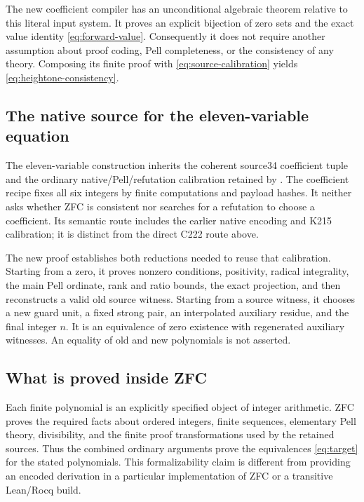 The new coefficient compiler has an unconditional algebraic theorem
relative to this literal input system. It proves an explicit bijection
of zero sets and the exact value identity \eqref{eq:forward-value}.
Consequently it does not require another assumption about proof coding,
Pell completeness, or the consistency of any theory. Composing its
finite proof with \eqref{eq:source-calibration} yields
\eqref{eq:heightone-consistency}.

\subsection{The native source for the eleven-variable equation}

The eleven-variable construction inherits the coherent source34
coefficient tuple and the ordinary native/Pell/refutation calibration
retained by \cite{coprime}. The coefficient recipe fixes all six
integers by finite computations and payload hashes. It neither asks
whether ZFC is consistent nor searches for a refutation to choose a
coefficient. Its semantic route includes the earlier native encoding
and K215 calibration; it is distinct from the direct C222 route above.

The new proof establishes both reductions needed to reuse that
calibration. Starting from a zero, it proves nonzero conditions,
positivity, radical integrality, the main Pell ordinate, rank and ratio
bounds, the exact projection, and then reconstructs a valid old source
witness. Starting from a source witness, it chooses a new guard unit,
a fixed strong pair, an interpolated auxiliary residue, and the final
integer $n$. It is an equivalence of zero existence with regenerated
auxiliary witnesses. An equality of old and new polynomials is not
asserted.

\subsection{What is proved inside ZFC}

Each finite polynomial is an explicitly specified object of integer
arithmetic. ZFC proves the required facts about ordered integers,
finite sequences, elementary Pell theory, divisibility, and the finite
proof transformations used by the retained sources. Thus the combined
ordinary arguments prove the equivalences \eqref{eq:target} for the
stated polynomials. This formalizability claim is different from
providing an encoded derivation in a particular implementation of ZFC
or a transitive Lean/Rocq build.

